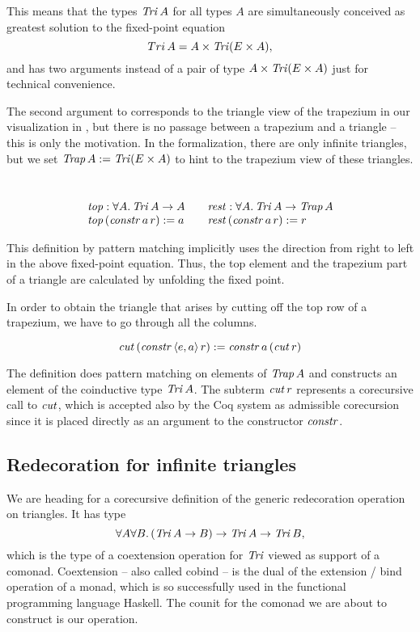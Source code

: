 This means that the types $\mathit{Tri}\,A$ for all types $A$ are simultaneously conceived as greatest solution to the fixed-point equation
$$Tri\,A = A \times \mathit{Tri}(E\times A),$$
and \constr{} has two arguments instead of a pair of type $A\times\mathit{Tri}(E\times A)$ just for technical convenience.

The second argument to \constr{} corresponds to the triangle view of the trapezium in our visualization in , but there
is no passage between a trapezium and a triangle -- this is only the motivation. In the formalization, there are only infinite triangles, but 
we set $\mathit{Trap}\,A:=\mathit{Tri}(E\times A)$ to hint to the trapezium view of these triangles.
\begin{definition}[Projections]\ 
  $$
  \begin{array}{l@{\hspace{2em}}l}
    \topT : \forall A.\,\Tri\,A \to A &
    \rest: \forall A.\, \Tri\,A \to \Trap\,A \\
    \topT\,(\constr\, a\, r) := a&
    \rest\,(\constr\, a\, r) := r
  \end{array}
  $$
\end{definition}
This definition by pattern matching implicitly uses the direction from
right to left in the above fixed-point equation. Thus, the top element and the trapezium part
of a triangle are calculated by unfolding the fixed point.

In order to obtain the triangle
that arises by cutting off the top row of a trapezium, we have to go
through all the columns.

\begin{definition}[$\cut:\forall A.\Trap\,A\to\Tri\,A$, defined corecursively]
$$\mathit{cut}\,(\mathit{constr} \,\langle e,a\rangle\, r):=\mathit{constr}\, a\,(\mathit{cut}\, r)$$
\end{definition}

The definition does pattern matching on elements of $\mathit{Trap}\,A$ and
constructs an element of the coinductive type $\mathit{Tri}\,A$. The subterm
$\mathit{cut} \,r$ represents a corecursive call to $\mathit{cut}$, which is accepted
also by the Coq system as admissible corecursion since it is placed directly
as an argument to the constructor $\mathit{constr}$.

\subsection{Redecoration for infinite triangles}

We are heading for a corecursive definition of the generic redecoration operation \redec{}
on triangles. It has type 
$$\forall A\forall B.\, (\mathit{Tri}\,A\to B)\to\mathit{Tri}\,A\to \mathit{Tri}\,B,$$
which is the type of a coextension operation for $\mathit{Tri}$ viewed as
support of a comonad.  Coextension -- also called cobind -- is the
dual of the extension / bind operation of a monad, which is so
successfully used in the functional programming language Haskell.
The counit for the comonad we are about to construct is our \topT{} operation.

